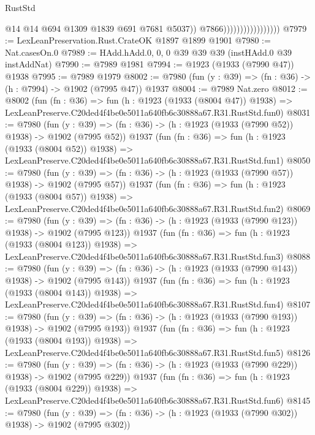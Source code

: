 \begin{lexlean}{RustStd}
\begin{coremodule}
                                          @14
                                          @14
                                          @694
                                          @1309
                                          @1839
                                          @691
                                          @7681
                                          @5037))
                                      @7866)))))))))))))))))
@7979 := LexLeanPreservation.Rust.CrateOK @1897 @1899 @1901
@7980 := Nat.casesOn.{0}
@7989 := HAdd.hAdd.{0, 0, 0} @39 @39 @39 (instHAdd.{0} @39 instAddNat)
@7990 := @7989 @1981
@7994 := @1923 (@1933 (@7990 @47)) @1938
@7995 := @7989 @1979
@8002 := @7980 (fun (y : @39) => (fn : @36) -> (h : @7994) -> @1902 (@7995 @47)) @1937
@8004 := @7989 Nat.zero
@8012 := @8002
    (fun (fn : @36) =>
    fun (h : @1923 (@1933 (@8004 @47)) @1938) =>
    LexLeanPreserve.C20ded4f4be0e5011a640fb6c30888a67.R31.RustStd.fun0)
@8031 := @7980
    (fun (y : @39) => (fn : @36) -> (h : @1923 (@1933 (@7990 @52)) @1938) -> @1902 (@7995 @52))
    @1937
    (fun (fn : @36) =>
    fun (h : @1923 (@1933 (@8004 @52)) @1938) =>
    LexLeanPreserve.C20ded4f4be0e5011a640fb6c30888a67.R31.RustStd.fun1)
@8050 := @7980
    (fun (y : @39) => (fn : @36) -> (h : @1923 (@1933 (@7990 @57)) @1938) -> @1902 (@7995 @57))
    @1937
    (fun (fn : @36) =>
    fun (h : @1923 (@1933 (@8004 @57)) @1938) =>
    LexLeanPreserve.C20ded4f4be0e5011a640fb6c30888a67.R31.RustStd.fun2)
@8069 := @7980
    (fun (y : @39) => (fn : @36) -> (h : @1923 (@1933 (@7990 @123)) @1938) -> @1902 (@7995 @123))
    @1937
    (fun (fn : @36) =>
    fun (h : @1923 (@1933 (@8004 @123)) @1938) =>
    LexLeanPreserve.C20ded4f4be0e5011a640fb6c30888a67.R31.RustStd.fun3)
@8088 := @7980
    (fun (y : @39) => (fn : @36) -> (h : @1923 (@1933 (@7990 @143)) @1938) -> @1902 (@7995 @143))
    @1937
    (fun (fn : @36) =>
    fun (h : @1923 (@1933 (@8004 @143)) @1938) =>
    LexLeanPreserve.C20ded4f4be0e5011a640fb6c30888a67.R31.RustStd.fun4)
@8107 := @7980
    (fun (y : @39) => (fn : @36) -> (h : @1923 (@1933 (@7990 @193)) @1938) -> @1902 (@7995 @193))
    @1937
    (fun (fn : @36) =>
    fun (h : @1923 (@1933 (@8004 @193)) @1938) =>
    LexLeanPreserve.C20ded4f4be0e5011a640fb6c30888a67.R31.RustStd.fun5)
@8126 := @7980
    (fun (y : @39) => (fn : @36) -> (h : @1923 (@1933 (@7990 @229)) @1938) -> @1902 (@7995 @229))
    @1937
    (fun (fn : @36) =>
    fun (h : @1923 (@1933 (@8004 @229)) @1938) =>
    LexLeanPreserve.C20ded4f4be0e5011a640fb6c30888a67.R31.RustStd.fun6)
@8145 := @7980
    (fun (y : @39) => (fn : @36) -> (h : @1923 (@1933 (@7990 @302)) @1938) -> @1902 (@7995 @302))

\end{coremodule}
\end{lexlean}

